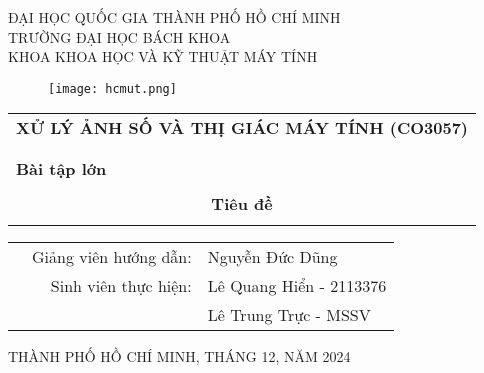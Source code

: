 \documentclass[a4paper]{article}
\begin{document}
	
	\begin{titlepage}
		\begin{center}
			ĐẠI HỌC QUỐC GIA THÀNH PHỐ HỒ CHÍ MINH \\
			TRƯỜNG ĐẠI HỌC BÁCH KHOA \\
			KHOA KHOA HỌC VÀ KỸ THUẬT MÁY TÍNH
		\end{center}
		
		\vspace{1cm}
		
		\begin{figure}[h!]
			\begin{center}
				\texttt{[image: hcmut.png]}
			\end{center}
		\end{figure}
		
		\vspace{1cm}
		
		
		\begin{center}
			\begin{tabular}{c}
				
				\multicolumn{1}{l}{\textbf{{\Large XỬ LÝ ẢNH SỐ VÀ THỊ GIÁC MÁY TÍNH (CO3057)}}}\\
				\\
				\hline
				\\
				\multicolumn{1}{l}{\textbf{{\Large Bài tập lớn}}}\\
				\\
				\textbf{{\Huge Tiêu đề}}\\
				\\
				\hline
			\end{tabular}
		\end{center}
		
		\vspace{3cm}
		
		\begin{table}[h]
			\begin{tabular}{rrl}
				\hspace{5 cm} & Giảng viên hướng dẫn: & Nguyễn Đức Dũng\\
				& Sinh viên thực hiện: & Lê Quang Hiển - 2113376 \\
				& & Lê Trung Trực - MSSV \\
			\end{tabular}
		\end{table}
		
		\begin{center}
			{\footnotesize THÀNH PHỐ HỒ CHÍ MINH, THÁNG 12, NĂM 2024}
		\end{center}
	\end{titlepage}
	
\end{document}
